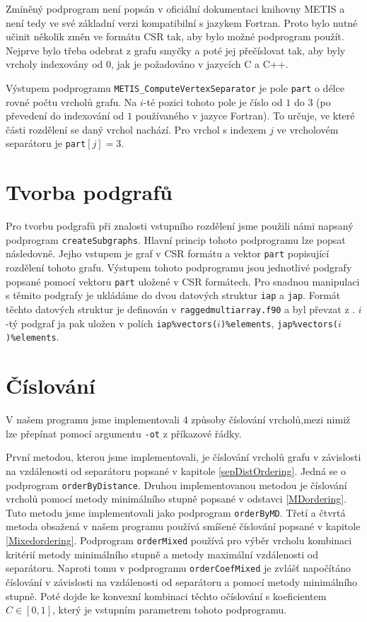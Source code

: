 \documentclass{ctuthesis}
\theoremstyle{plain}
\theoremstyle{definition}
\begin{document}
Zmíněný podprogram není popsán v oficiální dokumentaci knihovny METIS a není tedy ve své základní verzi kompatibilní s jazykem Fortran. Proto bylo nutné učinit několik změn ve formátu CSR tak, aby bylo možné podprogram použít. Nejprve bylo třeba odebrat z grafu smyčky a poté jej přečíslovat tak, aby byly vrcholy indexovány od 0, jak je požadováno v jazycích C a C++.

Výstupem podprogramu \texttt{METIS\_ComputeVertexSeparator} je pole \texttt{part} o délce rovné počtu vrcholů grafu. Na $i$-té pozici tohoto pole je číslo od $1$ do $3$ (po převedení do indexování od $1$ používaného v jazyce Fortran). To určuje, ve které části rozdělení se daný vrchol nachází. Pro vrchol s indexem $j$ ve vrcholovém separátoru je \texttt{part}$[j] = 3$.

\section{Tvorba podgrafů}
Pro tvorbu podgrafů při znalosti vstupního rozdělení jsme použili námi napsaný podprogram \texttt{createSubgraphs}. Hlavní princip tohoto podprogramu lze popsat následovně. Jejho vstupem je graf v CSR formátu a vektor \texttt{part} popisující rozdělení tohoto grafu. Výstupem tohoto podprogramu jsou jednotlivé podgrafy popsané pomocí vektoru \texttt{part} uložené v CSR formátech. Pro snadnou manipulaci s těmito podgrafy je ukládáme do dvou datových struktur \texttt{iap} a \texttt{jap}. Formát těchto datových struktur je definován v \texttt{raggedmultiarray.f90} a byl převzat z \cite{ragmult}. $i$-tý podgraf ja pak uložen v polích \texttt{iap\%vectors($i$)\%elements}, \texttt{jap\%vectors($i$)\%elements}.


\section{Číslování}
V našem programu jsme implementovali 4 způsoby číslování vrcholů,mezi nimiž lze přepínat pomocí argumentu \texttt{-ot} z příkazové řádky.

První metodou, kterou jsme implementovali, je číslování vrcholů grafu v závislosti na vzdálenosti od separátoru popsané v kapitole \ref{sepDistOrdering}. Jedná se o podprogram \texttt{orderByDistance}. Druhou implementovanou metodou je číslování vrcholů pomocí metody minimálního stupně popsané v odstavci \ref{MDordering}. Tuto metodu jsme implementovali jako podprogram \texttt{orderByMD}. Třetí a čtvrtá metoda obsažená v našem programu používá smíšené číslování popsané v kapitole \ref{Mixedordering}. Podprogram \texttt{orderMixed} používá pro výběr vrcholu kombinaci kritérií metody minimálního stupně a metody maximální vzdálenosti od separátoru. Naproti tomu v podprogramu \texttt{orderCoefMixed} je zvlášť napočítáno číslování v závislosti na vzdálenosti od separátoru a pomocí metody minimálního stupně. Poté dojde ke konvexní kombinaci těchto očíslování s koeficientem $C \in [0,1]$, který je vstupním parametrem tohoto podprogramu.
\end{document}
